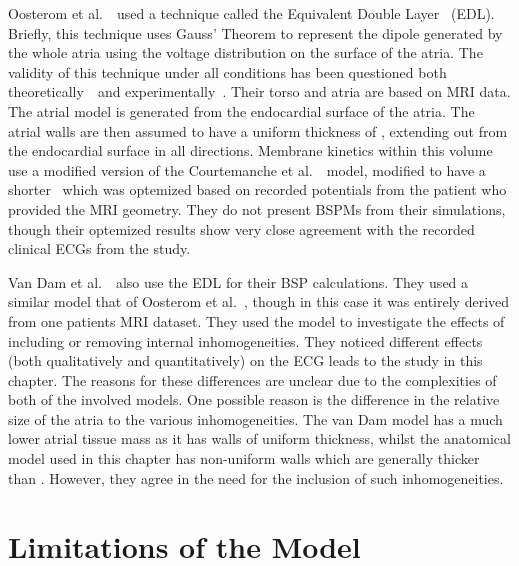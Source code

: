 Oosterom et al.~\cite{Oosterom2005}\ used a technique called the Equivalent
Double Layer~\cite{Huiskamp1988} (EDL).
Briefly, this technique uses Gauss' Theorem to represent the dipole generated by
the whole atria using the voltage distribution on the surface of the atria.
The validity of this technique under all conditions has been questioned both
theoretically~\cite{Geselowitz1992}\ and experimentally~\cite{Scher1994}.
Their torso and atria are based on MRI data.
The atrial model is generated from the endocardial surface of the atria.
The atrial walls are then assumed to have a uniform thickness of ,
extending out from the endocardial surface in all directions.
Membrane kinetics within this volume use a modified version of the Courtemanche
et al.~\cite{CRN98}\ model, modified to have a shorter \apd\ which was
optemized based on recorded potentials from the patient who provided the MRI
geometry.
They do not present BSPMs from their simulations, though their optemized results
show very close agreement with the recorded clinical ECGs from the study.

Van Dam et al.~\cite{vanDam2005}\ also use the EDL for their BSP calculations.
They used a similar model that of Oosterom et al.~\cite{Oosterom2005}, though in
this case it was entirely derived from one patients MRI dataset.
They used the model to investigate the effects of including or removing internal
inhomogeneities.
They noticed different effects (both qualitatively and quantitatively) on the
ECG leads to the study in this chapter.
The reasons for these differences are unclear due to the complexities of both of
the involved models.
One possible reason is the difference in the relative size of the atria to the various
inhomogeneities.
The van Dam model has a much lower atrial tissue mass as it has walls of uniform
thickness, whilst the anatomical model used in this chapter has non-uniform
walls which are generally thicker than .
However, they agree in the need for the inclusion of such inhomogeneities.

\section{Limitations of the Model}

